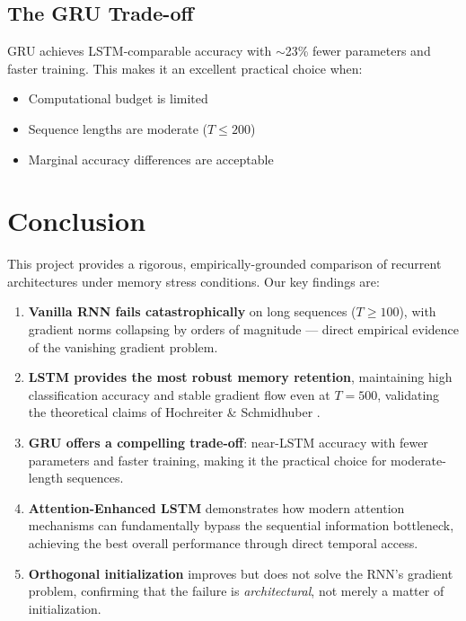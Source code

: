 \documentclass[12pt, a4paper]{article}
\begin{document}
\subsection{The GRU Trade-off}

GRU achieves LSTM-comparable accuracy with $\sim$23\% fewer parameters and faster training. This makes it an excellent practical choice when:
\begin{itemize}[leftmargin=2em]
    \item Computational budget is limited
    \item Sequence lengths are moderate ($T \leq 200$)
    \item Marginal accuracy differences are acceptable
\end{itemize}


\section{Conclusion}

This project provides a rigorous, empirically-grounded comparison of recurrent architectures under memory stress conditions. Our key findings are:

\begin{enumerate}[leftmargin=2em]
    \item \textbf{Vanilla RNN fails catastrophically} on long sequences ($T \geq 100$), with gradient norms collapsing by orders of magnitude — direct empirical evidence of the vanishing gradient problem.

    \item \textbf{LSTM provides the most robust memory retention}, maintaining high classification accuracy and stable gradient flow even at $T=500$, validating the theoretical claims of Hochreiter \& Schmidhuber \cite{hochreiter1997}.

    \item \textbf{GRU offers a compelling trade-off}: near-LSTM accuracy with fewer parameters and faster training, making it the practical choice for moderate-length sequences.

    \item \textbf{Attention-Enhanced LSTM} demonstrates how modern attention mechanisms can fundamentally bypass the sequential information bottleneck, achieving the best overall performance through direct temporal access.

    \item \textbf{Orthogonal initialization} improves but does not solve the RNN's gradient problem, confirming that the failure is \textit{architectural}, not merely a matter of initialization.
\end{enumerate}
\end{document}
